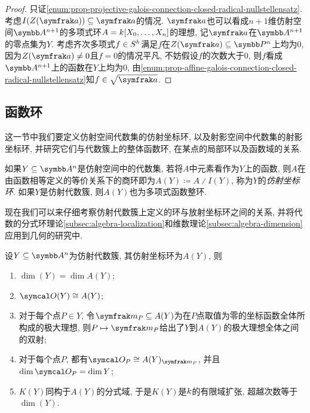 \begin{proof}
    只证\ref{enum:prop-projective-galois-connection-closed-radical-nullstellensatz}. 考虑$I(Z(\ideal{a}))\subseteq\ideal{a}$的情况. $\ideal{a}$也可以看成$n+1$维仿射空间$\AF^{n+1}$的多项式环$A=k [X_0, \dotsc, X_n]$的理想, 记$\ideal{a}$在$\AF^{n+1}$的零点集为$Y$. 考虑齐次多项式$f\in S^h$满足$f$在$Z(\ideal{a})\subseteq \PP^n$上均为0, 因为$Z(\ideal{a})\neq 0$且$f=0$的情况平凡, 不妨假设$f$的次数大于0, 则$f$看成$\AF^{n+1}$上的函数在$Y$上均为0, 由\ref{enum:prop-affine-galois-connection-closed-radical-nullstellensatz}知$f\in\sqrt{\ideal{a}}$.
\end{proof}

\subsection{函数环}\label{subsec:functionrings}

这一节中我们要定义仿射空间代数集的仿射坐标环, 以及射影空间中代数集的射影坐标环, 并研究它们与代数簇上的整体函数环, 在某点的局部环以及函数域的关系.

如果$Y\subseteq \AF^n$是仿射空间中的代数集, 若将$A$中元素看作为$Y$上的函数, 则$A$在由函数相等定义的等价关系下的商环即为$A(Y)\coloneq A{\divslash}I(Y)$, 称为$Y$的\emph{仿射坐标环}. 如果$Y$是仿射代数簇, 则$A(Y)$也为多项式函数整环.

现在我们可以来仔细考察仿射代数簇上定义的环与放射坐标环之间的关系, 并将代数的分式环理论\ref{subsec:algebra-localization}和维数理论\ref{subsec:algebra-dimension}应用到几何的研究中.

\begin{theorem}\label{thm:affinerings}
    设$Y\subseteq \AF^n$为仿射代数簇, 其仿射坐标环为$A(Y)$, 则
    \begin{enumerate}
        \item\label{enum:thm-affine-rings-1} $\dim (Y)=\dim A(Y)$;
        \item\label{enum:thm-affine-rings-2} $\OO(Y)\cong A(Y)$;
        \item\label{enum:thm-affine-rings-3} 对于每个点$P\in Y$, 令$\ideal{m}_P\subseteq A(Y)$为在$P$点取值为零的坐标函数全体所构成的极大理想, 则$P\mapsto \ideal{m}_P$给出了$Y$到$A(Y)$的极大理想全体之间的双射;
        \item\label{enum:thm-affine-rings-4} 对于每个点$P$, 都有$\OO_P\cong A(Y)_{\ideal{m}_P}$, 并且$\dim \OO_P=\dim Y$;
        \item\label{enum:thm-affine-rings-5} $K(Y)$同构于$A(Y)$的分式域, 于是$K(Y)$是$k$的有限域扩张, 超越次数等于$\dim (Y)$.
    \end{enumerate}
\end{theorem}

